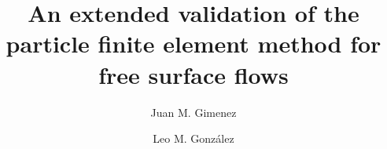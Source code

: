 \documentclass[review]{elsarticle}
\begin{document}
\begin{frontmatter}

\title{An extended validation of the particle finite element method for free surface flows}


\author[mymainaddress]{Juan M. Gimenez}
\author[mysecondaryaddress]{Leo M. Gonz\'{a}lez}
\address[mymainaddress]{Centro de Investigaci\'on de M\'etodos Computacionales (CIMEC) - UNL/CONICET, Predio Conicet-Santa Fe Colectora Ruta Nac 168
	      Paraje El Pozo, Santa Fe, Argentina.}
\address[mysecondaryaddress]{Escuela T\'{e}cnica Superior de Ingenieros Navales, Universidad Polit\'{e}cnica de Madrid (ETSIN-UPM), Avd. Arco de la Victoria 4, Madrid, Spain}


\end{frontmatter}
\end{document}

